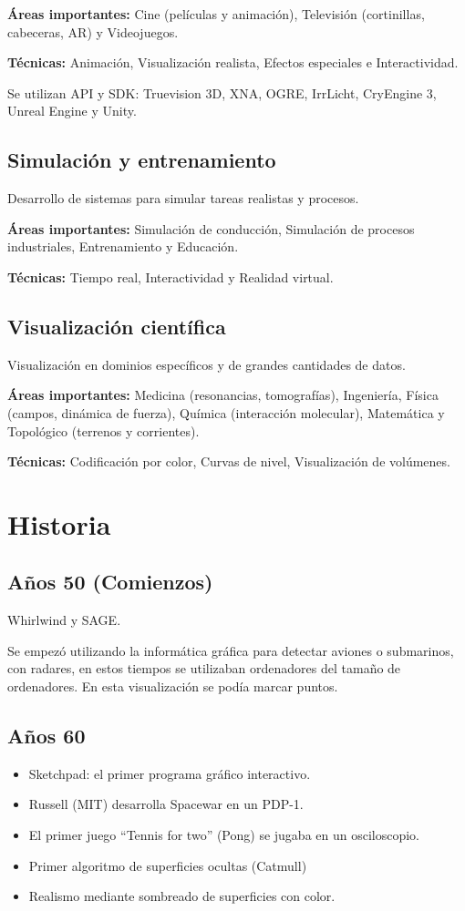 \textbf{Áreas importantes:} Cine (películas y animación), Televisión (cortinillas, cabeceras, AR) y Videojuegos.

\textbf{Técnicas:} Animación, Visualización realista, Efectos especiales e Interactividad.

Se utilizan API y SDK: Truevision 3D, XNA, OGRE, IrrLicht, CryEngine 3, Unreal Engine y Unity.

\subsection{Simulación y entrenamiento}\label{subsec:simulación-y-entrenamiento}
Desarrollo de sistemas para simular tareas realistas y procesos.

\textbf{Áreas importantes:} Simulación de conducción, Simulación de procesos industriales, Entrenamiento y Educación.

\textbf{Técnicas:} Tiempo real, Interactividad y Realidad virtual.

\subsection{Visualización científica}\label{subsec:visualización-cientifica}
Visualización en dominios específicos y de grandes cantidades de datos.

\textbf{Áreas importantes:} Medicina (resonancias, tomografías), Ingeniería, Física (campos, dinámica de fuerza), Química (interacción molecular), Matemática y Topológico (terrenos y corrientes).

\textbf{Técnicas:} Codificación por color, Curvas de nivel, Visualización de volúmenes.

\section{Historia}\label{sec:historia}
\subsection{Años 50 (Comienzos)}
Whirlwind y SAGE.

Se empezó utilizando la informática gráfica para detectar aviones o submarinos, con radares, en estos tiempos se utilizaban ordenadores del tamaño de ordenadores. En esta visualización se podía marcar puntos.

\subsection{Años 60}\label{subsec:años-60}
\begin{itemize}
	\item Sketchpad: el primer programa gráfico interactivo.
	\item Russell (MIT) desarrolla Spacewar en un PDP-1.
	\item El primer juego \enquote{Tennis for two} (Pong) se jugaba en un osciloscopio.
	\item Primer algoritmo de superficies ocultas (Catmull)
	\item Realismo mediante sombreado de superficies con color.
\end{itemize}

